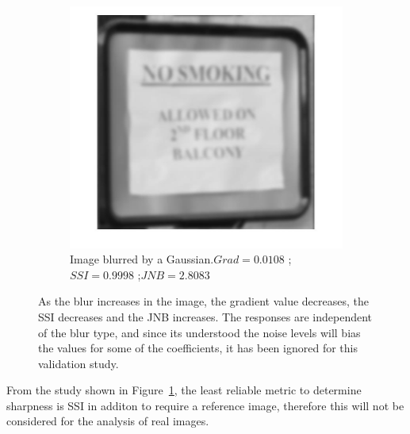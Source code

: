 \begin{figure}[h!]
\begin{subfigure}[b]{0.35\textwidth}
        \end{subfigure}
        \hspace{.6cm}
        \begin{subfigure}[b]{0.35\textwidth}
                \centering
                \includegraphics[width=\textwidth]{sign_G.jpg}
                \caption{Image blurred by a Gaussian.\newline $Grad=0.0108$ ; $SSI=0.9998$ ;\newline $JNB=2.8083$} 
        \end{subfigure} 
       
        \caption{As the blur increases in the image, the gradient value decreases, the SSI decreases and the JNB increases. The responses are independent of the blur type, and since its understood the noise levels will bias the values for some of the  coefficients, it has been ignored for this validation study.} \label{fig:train_metrics}
\end{figure}

\noindent From the study shown in Figure~\ref{fig:train_metrics}, the least reliable metric to determine sharpness is SSI in additon to require a reference image, therefore this will not be considered for the analysis of real images.

